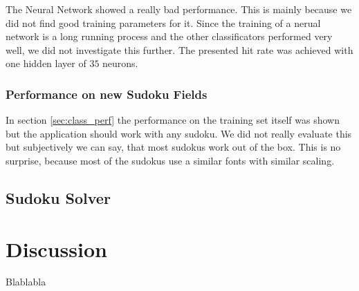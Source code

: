 \documentclass[
a4paper,     %
12pt         %
]{scrartcl}  %
\begin{document}
The Neural Network showed a really bad performance. This is mainly because we did not find good training
parameters for it. Since the training of a nerual network is a long running process and the other 
classificators performed very well, we did not investigate this further. The presented hit rate was
achieved with one hidden layer of $35$ neurons.

\subsubsection{Performance on new Sudoku Fields}

In section \ref{sec:class_perf} the performance on the training set itself was shown but the application
should work with any sudoku. We did not really evaluate this but subjectively we can say, that most
sudokus work out of the box. This is no surprise, because most of the sudokus use a similar fonts with
similar scaling.

\subsection{Sudoku Solver}

\section{Discussion}

Blablabla



% 

% 
\end{document}
